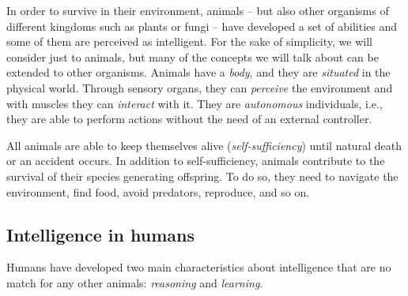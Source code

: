 In order to survive in their environment, animals -- but also other organisms of different kingdoms such as plants or fungi -- have developed a set of abilities and some of them are perceived as intelligent.
%
For the sake of simplicity, we will consider just to animals, but many of the concepts we will talk about can be extended to other organisms.
%
Animals have a \emph{body}, and they are \emph{situated} in the physical world.
%
Through sensory organs, they can \emph{perceive} the environment and with muscles they can \emph{interact} with it.
%
They are \emph{autonomous} individuals, i.e., they are able to perform actions without the need of an external controller.


All animals are able to keep themselves alive (\emph{self-sufficiency}) until natural death or an accident occurs.
%
In addition to self-sufficiency, animals contribute to the survival of their species generating offspring.
%
To do so, they need to navigate the environment, find food, avoid predators, reproduce, and so on.
%


\subsection{Intelligence in humans}\label{subsec:intelligence-in-humans}

Humans have developed two main characteristics about intelligence that are no match for any other animals: \emph{reasoning} and \emph{learning}.

